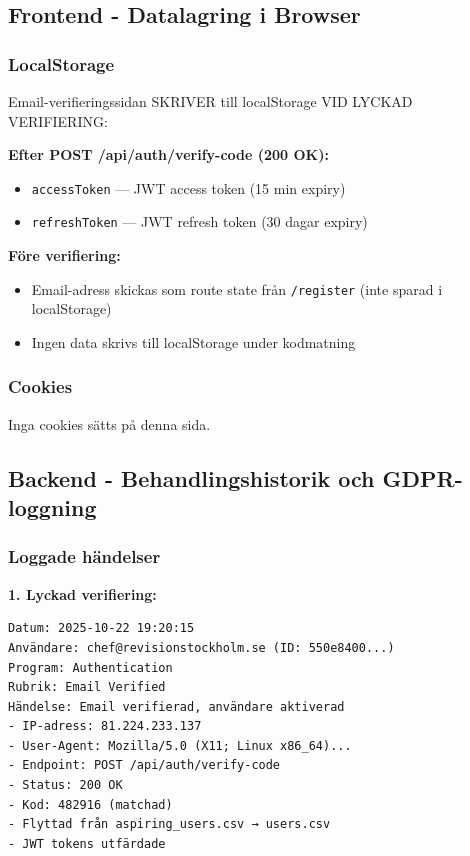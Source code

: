 \documentclass[12pt,a4paper]{article}
\begin{document}
\subsection{Frontend - Datalagring i Browser}

\subsubsection{LocalStorage}
Email-verifieringssidan SKRIVER till localStorage VID LYCKAD VERIFIERING:

\textbf{Efter POST /api/auth/verify-code (200 OK):}
\begin{itemize}[noitemsep]
  \item \texttt{accessToken} — JWT access token (15 min expiry)
  \item \texttt{refreshToken} — JWT refresh token (30 dagar expiry)
\end{itemize}

\textbf{Före verifiering:}
\begin{itemize}[noitemsep]
  \item Email-adress skickas som route state från \texttt{/register} (inte sparad i localStorage)
  \item Ingen data skrivs till localStorage under kodmatning
\end{itemize}

\subsubsection{Cookies}
Inga cookies sätts på denna sida.

\subsection{Backend - Behandlingshistorik och GDPR-loggning}

\subsubsection{Loggade händelser}

\textbf{1. Lyckad verifiering:}
\begin{verbatim}
Datum: 2025-10-22 19:20:15
Användare: chef@revisionstockholm.se (ID: 550e8400...)
Program: Authentication
Rubrik: Email Verified
Händelse: Email verifierad, användare aktiverad
- IP-adress: 81.224.233.137
- User-Agent: Mozilla/5.0 (X11; Linux x86_64)...
- Endpoint: POST /api/auth/verify-code
- Status: 200 OK
- Kod: 482916 (matchad)
- Flyttad från aspiring_users.csv → users.csv
- JWT tokens utfärdade
\end{verbatim}
\end{document}
